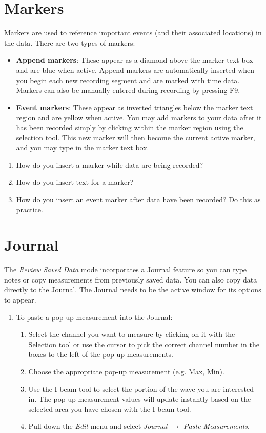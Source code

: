 \documentclass{article}
\begin{document}
\section*{Markers}
Markers are used to reference important events (and their associated locations) in the data. There are two types of markers:
\begin{itemize}
	\item \textbf{Append markers}: These appear as a diamond above the marker text box and are blue when active. Append markers are automatically inserted when you begin each new recording segment and are marked with time data. Markers can also be manually entered during recording by pressing F9.
	
	\item \textbf{Event markers}: These appear as inverted triangles below the marker text region and are yellow when active. You may add markers to your data after it has been recorded simply by clicking within the marker region using the selection tool. This new marker will then become the current active marker, and you may type in the marker text box.
\end{itemize}

\begin{enumerate}
	\item How do you insert a marker while data are being recorded?
	\item How do you insert text for a marker?
	\item How do you insert an event marker after data have been recorded? Do this as practice.
\end{enumerate}

\section*{Journal}
The \textit{Review Saved Data} mode incorporates a Journal feature so you can type notes or copy measurements from previously saved data. You can also copy data directly to the Journal. The Journal needs to be the active window for its options to appear.
\begin{enumerate}
	\item To paste a pop-up measurement into the Journal:
		\begin{enumerate}
			\item Select the channel you want to measure by clicking on it with the Selection tool or use the cursor to pick the correct channel number in the boxes to the left of the pop-up measurements.
			\item Choose the appropriate pop-up measurement (e.g. Max, Min).
			\item Use the I-beam tool to select the portion of the wave you are interested in. The pop-up measurement values will update instantly based on the selected area you have chosen with the I-beam tool.
			\item Pull down the \textit{Edit} menu and select \textit{Journal $\rightarrow$ Paste Measurements}. 
		\end{enumerate}
	\end{enumerate}
\end{document}
